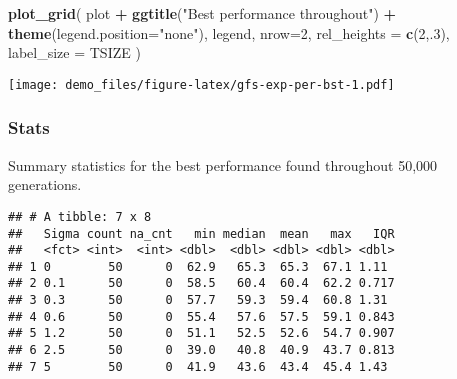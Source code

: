 \documentclass[]{book}
\newenvironment{Shaded}{\begin{snugshade}}{\end{snugshade}}
\newcommand{\DataTypeTok}[1]{\textcolor[rgb]{0.13,0.29,0.53}{#1}}
\newcommand{\DecValTok}[1]{\textcolor[rgb]{0.00,0.00,0.81}{#1}}
\newcommand{\KeywordTok}[1]{\textcolor[rgb]{0.13,0.29,0.53}{\textbf{#1}}}
\newcommand{\NormalTok}[1]{#1}
\newcommand{\OperatorTok}[1]{\textcolor[rgb]{0.81,0.36,0.00}{\textbf{#1}}}
\newcommand{\OtherTok}[1]{\textcolor[rgb]{0.56,0.35,0.01}{#1}}
\newcommand{\StringTok}[1]{\textcolor[rgb]{0.31,0.60,0.02}{#1}}
\begin{document}
\begin{Shaded}
\begin{Highlighting}[]
\KeywordTok{plot_grid}\NormalTok{(}
\NormalTok{  plot }\OperatorTok{+}
\StringTok{    }\KeywordTok{ggtitle}\NormalTok{(}\StringTok{"Best performance throughout"}\NormalTok{) }\OperatorTok{+}
\StringTok{    }\KeywordTok{theme}\NormalTok{(}\DataTypeTok{legend.position=}\StringTok{"none"}\NormalTok{),}
\NormalTok{  legend,}
  \DataTypeTok{nrow=}\DecValTok{2}\NormalTok{,}
  \DataTypeTok{rel_heights =} \KeywordTok{c}\NormalTok{(}\DecValTok{2}\NormalTok{,.}\DecValTok{3}\NormalTok{),}
  \DataTypeTok{label_size =}\NormalTok{ TSIZE}
\NormalTok{)}
\end{Highlighting}
\end{Shaded}

\texttt{[image: demo\_files/figure-latex/gfs-exp-per-bst-1.pdf]}

\hypertarget{stats-41}{%
\subsubsection{Stats}\label{stats-41}}

Summary statistics for the best performance found throughout 50,000 generations.

\begin{Shaded}
\end{Shaded}

\begin{verbatim}
## # A tibble: 7 x 8
##   Sigma count na_cnt   min median  mean   max   IQR
##   <fct> <int>  <int> <dbl>  <dbl> <dbl> <dbl> <dbl>
## 1 0        50      0  62.9   65.3  65.3  67.1 1.11 
## 2 0.1      50      0  58.5   60.4  60.4  62.2 0.717
## 3 0.3      50      0  57.7   59.3  59.4  60.8 1.31 
## 4 0.6      50      0  55.4   57.6  57.5  59.1 0.843
## 5 1.2      50      0  51.1   52.5  52.6  54.7 0.907
## 6 2.5      50      0  39.0   40.8  40.9  43.7 0.813
## 7 5        50      0  41.9   43.6  43.4  45.4 1.43
\end{verbatim}
\end{document}
